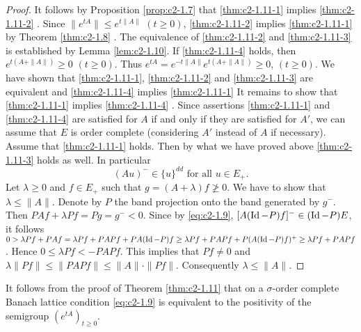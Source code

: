 \begin{proof}
It follows by Proposition \ref{prop:c2-1.7}   that  \ref{thm:c2-1.11-1}   implies \ref{thm:c2-1.11-2}  .
Since $\|e^{tA}\| \leq e^{t\|A\|}$ $(t\geq0)$, \ref{thm:c2-1.11-2}   implies \ref{thm:c2-1.11-1}   by Theorem \ref{thm:c2-1.8}   .
The equivalence of \ref{thm:c2-1.11-2}   and \ref{thm:c2-1.11-3}   is established by Lemma \ref{lem:c2-1.10}.
If \ref{thm:c2-1.11-4} holds, then $e^{t(A+\|A\|)} \geq 0$ $(t\geq0)$.
Thus $e^{tA} = e^{-t\|A\|} e^{t(A+\|A\|)} \geq 0$, $(t\geq0)$.
We have shown that \ref{thm:c2-1.11-1}, \ref{thm:c2-1.11-2}  and \ref{thm:c2-1.11-3} are equivalent and \ref{thm:c2-1.11-4}  implies \ref{thm:c2-1.11-1} 
It remains to show that \ref{thm:c2-1.11-1}  implies \ref{thm:c2-1.11-4}  .
Since assertions \ref{thm:c2-1.11-1}   and \ref{thm:c2-1.11-4}   are satisfied for $A$ if and only if they are satisfied for $A'$, we can assume that $E$ is order complete (considering $A'$ instead of $A$ if necessary).
Assume that \ref{thm:c2-1.11-1}   holds.
Then by what we have proved above \ref{thm:c2-1.11-3}   holds as well.
In particular
\begin{equation}\label{eq:c2-1.9}
(Au)^{-} \in \{u\}^{dd} \text{ for all } u \in E_{+}.
\end{equation}
Let $\lambda \geq 0$ and $f \in E_{+}$ such that $g = (A + \lambda)f \not\geq 0$.
We have to show that $\lambda \leq \|A\|$.
Denote by $P$ the band projection onto the band generated by $g^{-}$.
Then $PAf + \lambda Pf = Pg = g^{-} < 0$.
Since by  \eqref{eq:c2-1.9}, $[A(\operatorname{Id} - P)f]^{-} \in (\operatorname{Id} - P)E$, it follows 
$0 > \lambda Pf + PAf = \lambda Pf + PAPf + PA(\operatorname{Id}-P)f \geq \lambda Pf + PAPf + P(A(\operatorname{Id}-P)f)^{+} \geq \lambda Pf + PAPf$.
Hence $0 \leq \lambda Pf < -PAPf$.
This implies that $Pf \neq 0$ and $\lambda\|Pf\| \leq \|PAPf\| \leq \|A\|\cdot\|Pf\|$.
Consequently $\lambda \leq \|A\|$.
\end{proof}

\begin{remark}\label{rem:c2-1.12}
It follows from the proof of Theorem \ref{thm:c2-1.11}   that on a $\sigma$-order complete Banach lattice condition  \eqref{eq:c2-1.9} is equivalent to the positivity of the semigroup $(e^{tA})_{t \geq 0}$.
\end{remark}

